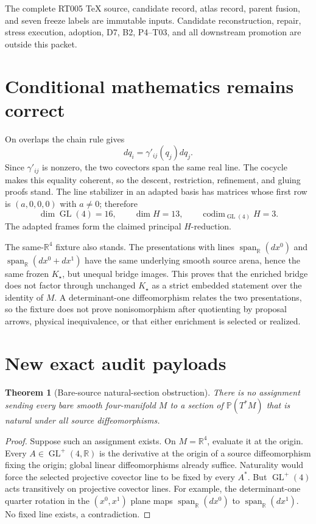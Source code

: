 \documentclass[11pt]{article}
\newtheorem{theorem}{Theorem}
\newcommand{\GL}{\operatorname{GL}}
\newcommand{\Span}{\operatorname{span}_{\mathbb R}}
\begin{document}
The complete RT005 TeX source, candidate record, atlas record, parent fusion,
and seven freeze labels are immutable inputs.  Candidate reconstruction,
repair, stress execution, adoption, D7, B2, P4--T03, and all downstream
promotion are outside this packet.

\section{Conditional mathematics remains correct}

On overlaps the chain rule gives
\[
 dq_i=\gamma'_{ij}(q_j)dq_j.
\]
Since $\gamma'_{ij}$ is nonzero, the two covectors span the same real line.
The cocycle makes this equality coherent, so the descent, restriction,
refinement, and gluing proofs stand.  The line stabilizer in an adapted basis
has matrices whose first row is $(a,0,0,0)$ with $a\ne0$; therefore
\[
 \dim \GL(4)=16,
 \qquad \dim H=13,
 \qquad \operatorname{codim}_{\GL(4)}H=3.
\]
The adapted frames form the claimed principal $H$-reduction.

The same-$\mathbb R^4$ fixture also stands.  The presentations with lines
$\Span(dx^0)$ and $\Span(dx^0+dx^1)$ have the same underlying smooth source
arena, hence the same frozen $K_\star$, but unequal bridge images.  This proves
that the enriched bridge does not factor through unchanged $K_\star$ as a
strict embedded statement over the identity of $M$.  A determinant-one
diffeomorphism relates the two presentations, so the fixture does not prove
nonisomorphism after quotienting by proposal arrows, physical inequivalence,
or that either enrichment is selected or realized.

\section{New exact audit payloads}

\begin{theorem}[Bare-source natural-section obstruction]
There is no assignment sending every bare smooth four-manifold $M$ to a
section of $\mathbb P(T^*M)$ that is natural under all source
diffeomorphisms.
\end{theorem}

\begin{proof}
Suppose such an assignment exists.  On $M=\mathbb R^4$, evaluate it at the
origin.  Every $A\in\GL^+(4,\mathbb R)$ is the derivative at the origin of a
source diffeomorphism fixing the origin; global linear diffeomorphisms already
suffice.  Naturality would force the selected projective covector line to be
fixed by every $A^*$.  But $\GL^+(4)$ acts transitively on projective
covector lines.  For example, the determinant-one quarter rotation in the
$(x^0,x^1)$ plane maps $\Span(dx^0)$ to $\Span(dx^1)$.  No fixed line exists,
a contradiction.
\end{proof}
\end{document}
